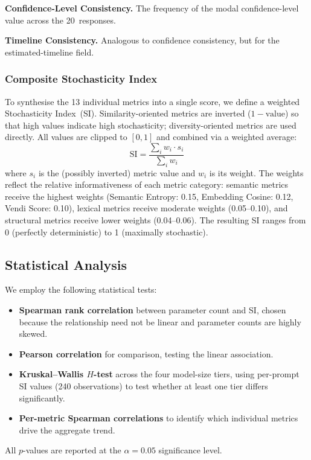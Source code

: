 \documentclass[11pt,a4paper]{article}
\begin{document}
\textbf{Confidence-Level Consistency.}
The frequency of the modal confidence-level value across the 20~responses.

\textbf{Timeline Consistency.}
Analogous to confidence consistency, but for the estimated-timeline field.

\subsubsection{Composite Stochasticity Index}

To synthesise the 13 individual metrics into a single score, we define a weighted Stochasticity Index~(SI).
Similarity-oriented metrics are inverted ($1 - \text{value}$) so that high values indicate high stochasticity; diversity-oriented metrics are used directly.
All values are clipped to $[0, 1]$ and combined via a weighted average:
\begin{equation}
\label{eq:si}
\text{SI} = \frac{\sum_{i} w_i \cdot s_i}{\sum_{i} w_i}
\end{equation}
where $s_i$ is the (possibly inverted) metric value and $w_i$ is its weight.
The weights reflect the relative informativeness of each metric category: semantic metrics receive the highest weights (Semantic Entropy: 0.15, Embedding Cosine: 0.12, Vendi Score: 0.10), lexical metrics receive moderate weights (0.05--0.10), and structural metrics receive lower weights (0.04--0.06).
The resulting SI ranges from 0 (perfectly deterministic) to 1 (maximally stochastic).

\subsection{Statistical Analysis}
\label{sec:stats}

We employ the following statistical tests:
\begin{itemize}[leftmargin=2em,itemsep=2pt]
    \item \textbf{Spearman rank correlation} between parameter count and SI, chosen because the relationship need not be linear and parameter counts are highly skewed.
    \item \textbf{Pearson correlation} for comparison, testing the linear association.
    \item \textbf{Kruskal--Wallis $H$-test} across the four model-size tiers, using per-prompt SI values (240 observations) to test whether at least one tier differs significantly.
    \item \textbf{Per-metric Spearman correlations} to identify which individual metrics drive the aggregate trend.
\end{itemize}
All $p$-values are reported at the $\alpha = 0.05$ significance level.
\end{document}
